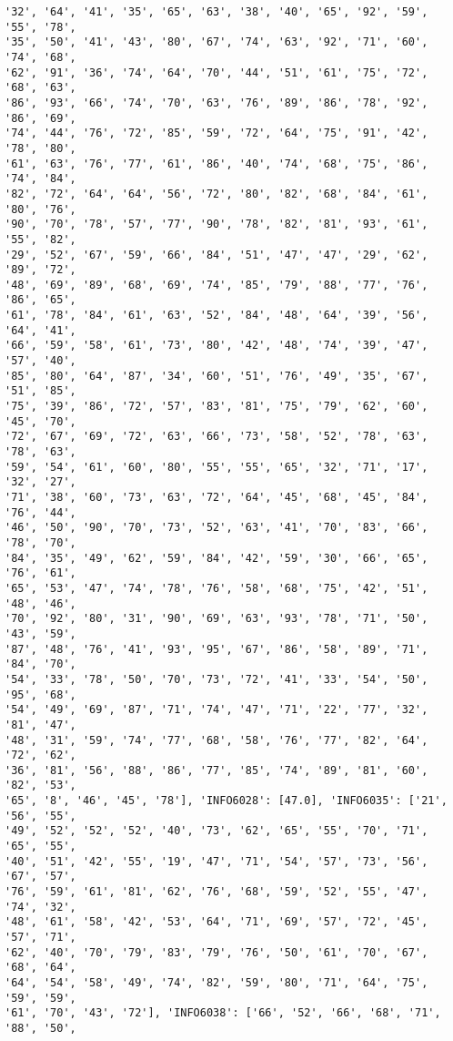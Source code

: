 \documentclass[11pt]{article}
\begin{document}
\begin{Verbatim}[commandchars=\\\{\}]
'32', '64', '41', '35', '65', '63', '38', '40', '65', '92', '59', '55', '78',
'35', '50', '41', '43', '80', '67', '74', '63', '92', '71', '60', '74', '68',
'62', '91', '36', '74', '64', '70', '44', '51', '61', '75', '72', '68', '63',
'86', '93', '66', '74', '70', '63', '76', '89', '86', '78', '92', '86', '69',
'74', '44', '76', '72', '85', '59', '72', '64', '75', '91', '42', '78', '80',
'61', '63', '76', '77', '61', '86', '40', '74', '68', '75', '86', '74', '84',
'82', '72', '64', '64', '56', '72', '80', '82', '68', '84', '61', '80', '76',
'90', '70', '78', '57', '77', '90', '78', '82', '81', '93', '61', '55', '82',
'29', '52', '67', '59', '66', '84', '51', '47', '47', '29', '62', '89', '72',
'48', '69', '89', '68', '69', '74', '85', '79', '88', '77', '76', '86', '65',
'61', '78', '84', '61', '63', '52', '84', '48', '64', '39', '56', '64', '41',
'66', '59', '58', '61', '73', '80', '42', '48', '74', '39', '47', '57', '40',
'85', '80', '64', '87', '34', '60', '51', '76', '49', '35', '67', '51', '85',
'75', '39', '86', '72', '57', '83', '81', '75', '79', '62', '60', '45', '70',
'72', '67', '69', '72', '63', '66', '73', '58', '52', '78', '63', '78', '63',
'59', '54', '61', '60', '80', '55', '55', '65', '32', '71', '17', '32', '27',
'71', '38', '60', '73', '63', '72', '64', '45', '68', '45', '84', '76', '44',
'46', '50', '90', '70', '73', '52', '63', '41', '70', '83', '66', '78', '70',
'84', '35', '49', '62', '59', '84', '42', '59', '30', '66', '65', '76', '61',
'65', '53', '47', '74', '78', '76', '58', '68', '75', '42', '51', '48', '46',
'70', '92', '80', '31', '90', '69', '63', '93', '78', '71', '50', '43', '59',
'87', '48', '76', '41', '93', '95', '67', '86', '58', '89', '71', '84', '70',
'54', '33', '78', '50', '70', '73', '72', '41', '33', '54', '50', '95', '68',
'54', '49', '69', '87', '71', '74', '47', '71', '22', '77', '32', '81', '47',
'48', '31', '59', '74', '77', '68', '58', '76', '77', '82', '64', '72', '62',
'36', '81', '56', '88', '86', '77', '85', '74', '89', '81', '60', '82', '53',
'65', '8', '46', '45', '78'], 'INFO6028': [47.0], 'INFO6035': ['21', '56', '55',
'49', '52', '52', '52', '40', '73', '62', '65', '55', '70', '71', '65', '55',
'40', '51', '42', '55', '19', '47', '71', '54', '57', '73', '56', '67', '57',
'76', '59', '61', '81', '62', '76', '68', '59', '52', '55', '47', '74', '32',
'48', '61', '58', '42', '53', '64', '71', '69', '57', '72', '45', '57', '71',
'62', '40', '70', '79', '83', '79', '76', '50', '61', '70', '67', '68', '64',
'64', '54', '58', '49', '74', '82', '59', '80', '71', '64', '75', '59', '59',
'61', '70', '43', '72'], 'INFO6038': ['66', '52', '66', '68', '71', '88', '50',

\end{Verbatim}
\end{document}
